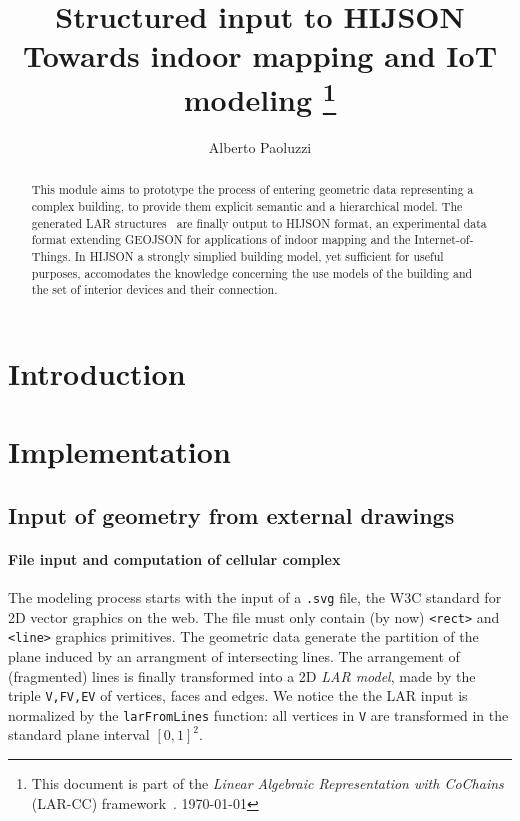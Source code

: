 \documentclass[11pt,oneside]{article}    %
\title{Structured input to HIJSON\\ Towards indoor mapping and IoT modeling
\footnote{This document is part of the \emph{Linear Algebraic Representation with CoChains} (LAR-CC) framework~\cite{cclar-proj:2013:00}. \today}
}
\author{Alberto Paoluzzi}
\begin{document}
\maketitle

\begin{abstract}
This module aims to prototype the process of entering geometric data representing a complex building, to provide them explicit semantic and a hierarchical model. The generated LAR structures~\cite{Dicarlo:2014:TNL:2543138.2543294,paodcvjcadanda2015} are finally output to HIJSON format, an experimental data format extending GEOJSON for applications of indoor mapping and the Internet-of-Things. In HIJSON  a strongly simplied building model, yet sufficient for useful purposes, accomodates the knowledge concerning the use models of the building and the set of interior devices and their connection. 
\end{abstract}

\tableofcontents

\section{Introduction}

\section{Implementation}

\subsection{Input of geometry from external drawings}

\paragraph{File input and computation of cellular complex}
The modeling process starts with the input of a \texttt{.svg} file, the W3C standard for 2D vector graphics on the web.
The file must only contain (by now) \texttt{<rect>} and \texttt{<line>} graphics primitives.
The geometric data generate the partition of the plane induced by an arrangment of intersecting lines.
The arrangement of (fragmented) lines is finally transformed into a 2D \emph{LAR model}, made by the triple \texttt{V,FV,EV} of vertices, faces and edges.
We notice the the LAR input is normalized by the \texttt{larFromLines} function: all vertices in \texttt{V} are transformed in the standard plane interval $[0,1]^2$.
\end{document}
